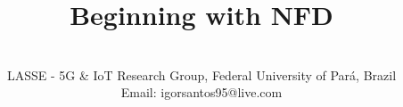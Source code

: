 \documentclass[11pt,conference]{./IEEEtran}
\newcommand{\mytitle}{Beginning with NFD}
\begin{document}
 

\title{\mytitle}

                               
\author{
 \\
 LASSE - 5G \& IoT Research Group, Federal University of Par\'{a}, Brazil\\
Email: igorsantos95@live.com
}


\maketitle
\end{document}
